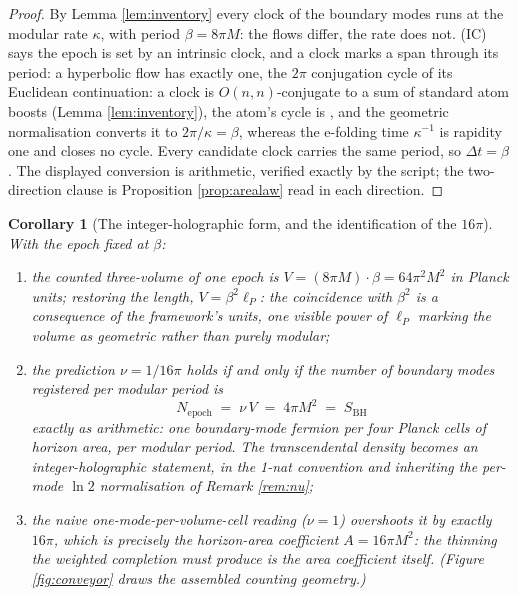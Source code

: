 \documentclass[11pt]{article}
\newtheorem{corollary}[theorem]{Corollary}
\theoremstyle{definition}
\newcommand{\lP}{\ell_{P}}
\newcommand{\SBH}{S_{\mathrm{BH}}}
\begin{document}
\begin{proof}
By Lemma \ref{lem:inventory} every clock of the boundary modes runs at the modular rate $\kappa$, with period $\beta = 8\pi M$: the flows differ, the rate does not. (IC) says the epoch is set by an intrinsic clock, and a clock marks a span through its period: a hyperbolic flow has exactly one, the $2\pi$ conjugation cycle of its Euclidean continuation: a clock is $O(n,n)$-conjugate to a sum of standard atom boosts (Lemma \ref{lem:inventory}), the atom's cycle is \cite[Prop.~7.21(1)]{ButlerT5}, and the geometric normalisation converts it to $2\pi/\kappa = \beta$, whereas the e-folding time $\kappa^{-1}$ is rapidity one and closes no cycle. Every candidate clock carries the same period, so $\Delta t = \beta$. The displayed conversion is arithmetic, verified exactly by the script; the two-direction clause is Proposition \ref{prop:arealaw} read in each direction.
\end{proof}

\begin{corollary}[The integer-holographic form, and the identification of the $16\pi$]\label{cor:holographic}
With the epoch fixed at $\beta$:
\begin{enumerate}
\item the counted three-volume of one epoch is $V = (8\pi M)\cdot\beta = 64\pi^2M^2$ in Planck units; restoring the length, $V = \beta^2\lP$: the coincidence with $\beta^2$ is a consequence of the framework's units, one visible power of $\lP$ marking the volume as geometric rather than purely modular;
\item the prediction $\nu = 1/16\pi$ holds if and only if the number of boundary modes registered per modular period is
\[
N_{\mathrm{epoch}} \;=\; \nu\,V \;=\; 4\pi M^2 \;=\; \SBH
\]
exactly as arithmetic: \emph{one boundary-mode fermion per four Planck cells of horizon area, per modular period}. The transcendental density becomes an integer-holographic statement, in the 1-nat convention and inheriting the per-mode $\ln 2$ normalisation of Remark \ref{rem:nu};
\item the naive one-mode-per-volume-cell reading ($\nu = 1$) overshoots it by exactly $16\pi$, which is precisely the horizon-area coefficient $A = 16\pi M^2$: the thinning the weighted completion must produce is the area coefficient itself. (Figure \ref{fig:conveyor} draws the assembled counting geometry.)
\end{enumerate}
\end{corollary}
\end{document}
